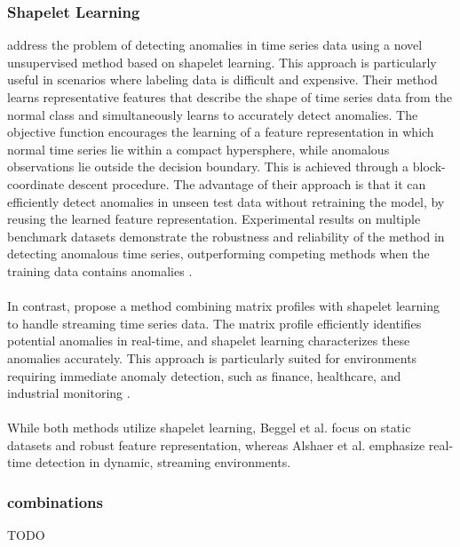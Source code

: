 \subsubsection{Shapelet Learning}
 address the problem of detecting anomalies in time series data using a novel unsupervised method based on shapelet learning. This approach is particularly useful in scenarios where labeling data is difficult and expensive.
Their method learns representative features that describe the shape of time series data from the normal class and simultaneously learns to accurately detect anomalies. The objective function encourages the learning of a feature representation in which normal time series lie within a compact hypersphere, while anomalous observations lie outside the decision boundary. This is achieved through a block-coordinate descent procedure.
The advantage of their approach is that it can efficiently detect anomalies in unseen test data without retraining the model, by reusing the learned feature representation. Experimental results on multiple benchmark datasets demonstrate the robustness and reliability of the method in detecting anomalous time series, outperforming competing methods when the training data contains anomalies \cite{beggel_time_2019}.\\\\
In contrast,  propose a method combining matrix profiles with shapelet learning to handle streaming time series data. The matrix profile efficiently identifies potential anomalies in real-time, and shapelet learning characterizes these anomalies accurately. This approach is particularly suited for environments requiring immediate anomaly detection, such as finance, healthcare, and industrial monitoring \cite{alshaer_detecting_2020}.\\\\
While both methods utilize shapelet learning, Beggel et al. focus on static datasets and robust feature representation, whereas Alshaer et al. emphasize real-time detection in dynamic, streaming environments.
\subsubsection{combinations}
TODO
\cite{aota_zero-shot_2023} \\\\ %
\cite{li_zero-shot_2023} \\\\ %
